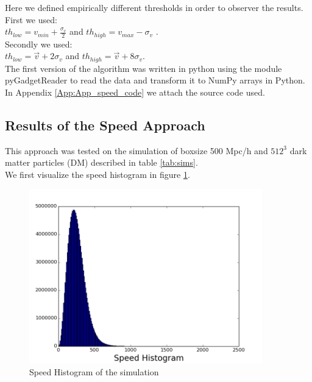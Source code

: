 \documentclass[12pt]{article}
\begin{document}
Here we defined empirically different thresholds
 in order to observer the results. \\
First we used:  \\
$th_{low} = v_{min} + \frac{\sigma_{v}}{2} $ and
 $th_{high} = v_{max}  - \sigma_{v}$ .\\
Secondly we used: \\
$th_{low} = \vec{v} + 2  \sigma_{v} $ and $th_{high} = \vec{v}  +  8 \sigma_{v}$.\\

The first version of the algorithm was written in
 python using the module
pyGadgetReader
 \cite{thompson_pygadgetreader_2014ascl_soft11001T}
  to read the
data and transform it to NumPy arrays in Python.
 In Appendix \ref{App:App_speed_code} we attach
  the source code used.

\subsection{Results of the Speed Approach}
This approach was tested on the simulation of
 boxsize 500 Mpc/h
and $512^{3}$ dark matter particles (DM) described
 in table \ref{tab:sims}. \\

We first visualize the speed histogram in figure
 \ref{fg:hist_vel}.\\

\begin{figure}[ht]
\begin{center}
\includegraphics[width=0.9\textwidth]{graphs/hist_vel.png} %
\caption{Speed Histogram of the simulation}
\label{fg:hist_vel}
\end{center}
\end{figure}
\FloatBarrier
\end{document}
